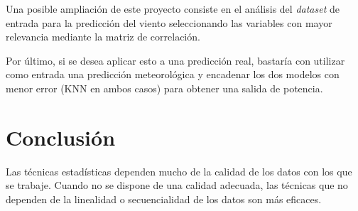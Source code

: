 \documentclass[journal]{IEEEtran}
\begin{document}
Una posible ampliación de este proyecto consiste en el análisis del \emph{dataset} de entrada para la predicción del viento seleccionando las variables con mayor relevancia mediante la matriz de correlación.

Por último, si se desea aplicar esto a una predicción real, bastaría con utilizar como entrada una predicción meteorológica y encadenar los dos modelos con menor error (KNN en ambos casos) para obtener una salida de potencia.

\section{Conclusión}
Las técnicas estadísticas dependen mucho de la calidad de los datos con los que se trabaje. Cuando no se dispone de una calidad adecuada, las técnicas que no dependen de la linealidad o secuencialidad de los datos son más eficaces.




%







\medskip
\end{document}

